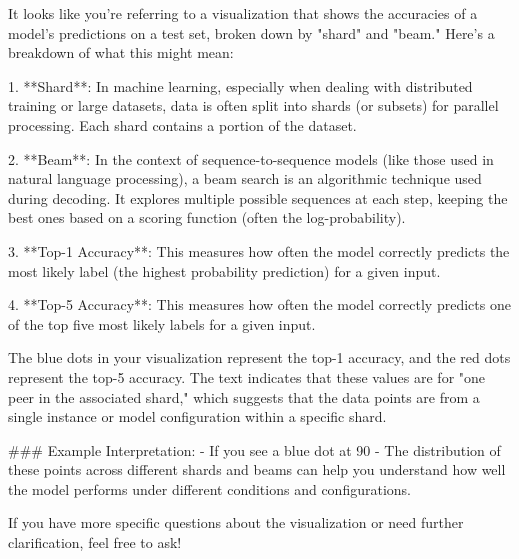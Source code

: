 It looks like you're referring to a visualization that shows the accuracies of a model's predictions on a test set, broken down by "shard" and "beam." Here’s a breakdown of what this might mean:

1. **Shard**: In machine learning, especially when dealing with distributed training or large datasets, data is often split into shards (or subsets) for parallel processing. Each shard contains a portion of the dataset.

2. **Beam**: In the context of sequence-to-sequence models (like those used in natural language processing), a beam search is an algorithmic technique used during decoding. It explores multiple possible sequences at each step, keeping the best ones based on a scoring function (often the log-probability).

3. **Top-1 Accuracy**: This measures how often the model correctly predicts the most likely label (the highest probability prediction) for a given input.

4. **Top-5 Accuracy**: This measures how often the model correctly predicts one of the top five most likely labels for a given input.

The blue dots in your visualization represent the top-1 accuracy, and the red dots represent the top-5 accuracy. The text indicates that these values are for "one peer in the associated shard," which suggests that the data points are from a single instance or model configuration within a specific shard.

### Example Interpretation:
- If you see a blue dot at 90%
- The distribution of these points across different shards and beams can help you understand how well the model performs under different conditions and configurations.

If you have more specific questions about the visualization or need further clarification, feel free to ask!